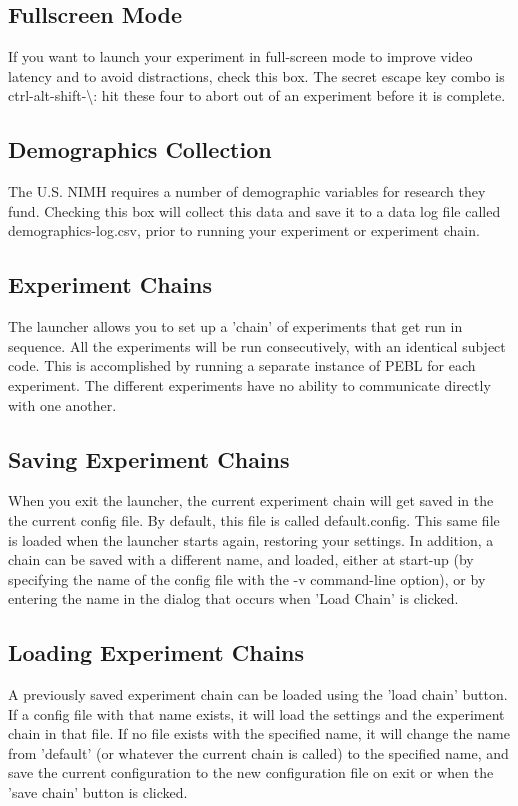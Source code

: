 \subsection{Fullscreen Mode}
If you want to launch your experiment in full-screen mode to improve
video latency and to avoid distractions, check this box. The secret
escape key combo is ctrl-alt-shift-\textbackslash : hit these four to abort out of
an experiment before it is complete.

\subsection{Demographics Collection}
The U.S. NIMH requires a number of demographic variables for research
they fund. Checking this box will collect this data and save it to a
data log file called demographics-log.csv, prior to running your experiment or experiment chain.

\subsection{Experiment Chains}
The launcher allows you to set up a 'chain' of experiments that get run in sequence.  All the experiments will be run consecutively, with an identical subject code.  This is accomplished by running a separate instance of PEBL for each experiment.  The different experiments have no ability to communicate directly with one another.


\subsection{Saving Experiment Chains}
When you exit the launcher, the current experiment chain will get saved in the the current config file.  By default, this file is called default.config.  This same file is loaded when the launcher starts again, restoring your settings.  In addition, a chain can be saved with a different name, and loaded, either at start-up (by specifying the name of the config file with the -v command-line option), or by entering the name in the dialog that occurs when 'Load  Chain' is clicked.

\subsection{Loading Experiment Chains}
A previously saved experiment chain can be loaded using the 'load chain' button.  If a config file with that name exists, it will load the settings and the experiment chain in that file.  If no file exists with the specified name, it will change the name from 'default' (or whatever the current chain is called) to the specified name, and save the current configuration to the new configuration file on exit or when the 'save chain' button is clicked.

